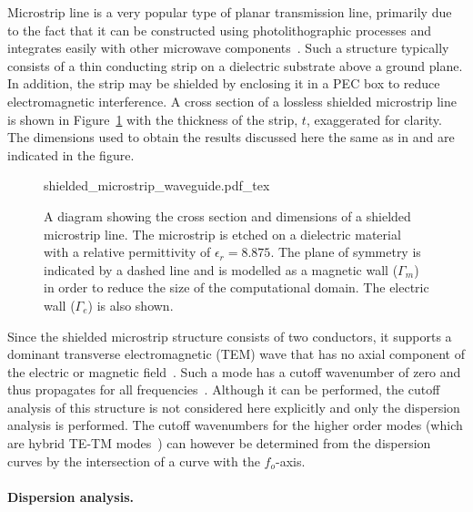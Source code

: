 Microstrip line is a very popular type of planar transmission
line, primarily due to the fact that it can be constructed using
photolithographic processes and integrates easily with other microwave
components~\citep{Pozar2005}. Such a structure typically consists of a
thin conducting strip on a dielectric substrate above a ground plane. In
addition, the strip may be shielded by enclosing it in a PEC box to reduce
electromagnetic interference. A cross section of a lossless shielded
microstrip line is shown in Figure~\ref{fig:lezar:shielded_microstrip}
with the thickness of the strip, $t$, exaggerated for clarity. The
dimensions used to obtain the results discussed here the same as
in \citet{PelosiCoccioliSelleri1998} and are indicated in the figure.
\begin{figure}
    \centering
    \def\svgwidth{\smallfig}
    {shielded_microstrip_waveguide.pdf_tex}
    \caption{A diagram showing the cross section and dimensions of a
    shielded microstrip line. The microstrip is etched on a dielectric
    material with a relative permittivity of $\epsilon_r = 8.875$. The
    plane of symmetry is indicated by a dashed line and is modelled
    as a magnetic wall ($\Gamma_m$) in order to reduce the size of the
    computational domain. The electric wall ($\Gamma_e$) is also shown.}
    \label{fig:lezar:shielded_microstrip}
\end{figure}

Since the shielded microstrip structure consists of two
conductors, it supports a dominant transverse electromagnetic
(TEM) wave that has no axial component of the electric or
magnetic field~\citep{Pozar2005}. Such a mode has a cutoff
wavenumber of zero and thus propagates for all
frequencies~\citep{Jin2002,PelosiCoccioliSelleri1998}. Although it can
be performed, the cutoff analysis of this structure is not considered
here explicitly and only the dispersion analysis is performed. The
cutoff wavenumbers for the higher order modes (which are hybrid TE-TM
modes~\citep{Pozar2005}) can however be determined from the dispersion
curves by the intersection of a curve with the $f_o$-axis.

\paragraph{Dispersion analysis.}

